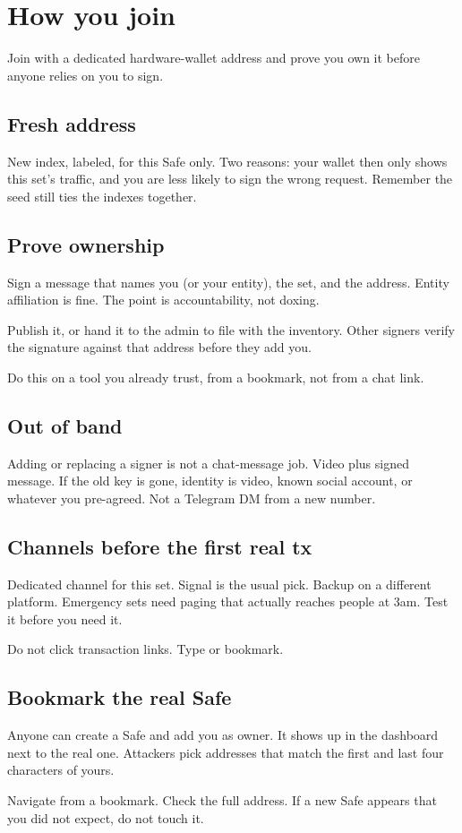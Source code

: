 \chapter{How you join}

Join with a dedicated hardware-wallet address and
prove you own it before anyone relies on you to
sign.

\section{Fresh address}

New index, labeled, for this Safe only. Two
reasons: your wallet then only shows this set's
traffic, and you are less likely to sign the wrong
request. Remember the seed still ties the indexes
together.

\section{Prove ownership}

Sign a message that names you (or your entity),
the set, and the address. Entity affiliation is
fine. The point is accountability, not doxing.

Publish it, or hand it to the admin to file with
the inventory. Other signers verify the signature
against that address before they add you.

Do this on a tool you already trust, from a
bookmark, not from a chat link.

\section{Out of band}

Adding or replacing a signer is not a chat-message
job. Video plus signed message. If the old key is
gone, identity is video, known social account, or
whatever you pre-agreed. Not a Telegram DM from a
new number.

\section{Channels before the first real tx}

Dedicated channel for this set. Signal is the
usual pick. Backup on a different platform.
Emergency sets need paging that actually reaches
people at 3am. Test it before you need it.

Do not click transaction links. Type or bookmark.

\section{Bookmark the real Safe}

Anyone can create a Safe and add you as owner.
It shows up in the dashboard next to the real
one. Attackers pick addresses that match the first
and last four characters of yours.

Navigate from a bookmark. Check the full address.
If a new Safe appears that you did not expect, do
not touch it.

